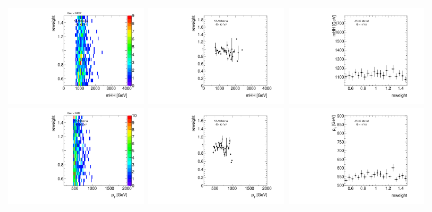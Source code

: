\begin{figure}[htbp!]
\begin{center}
\includegraphics[angle=270, width=0.32\textwidth]{./figures/boosted/AppendixReweight/Weights/4Trk_Signal_mHH_l_weight.pdf}
\includegraphics[angle=270, width=0.32\textwidth]{./figures/boosted/AppendixReweight/Weights/4Trk_Signal_mHH_l_weight_profx.pdf}
\includegraphics[angle=270, width=0.32\textwidth]{./figures/boosted/AppendixReweight/Weights/4Trk_Signal_mHH_l_weight_profy.pdf}\\
\includegraphics[angle=270, width=0.32\textwidth]{./figures/boosted/AppendixReweight/Weights/4Trk_Signal_leadHCand_Pt_m_weight.pdf}
\includegraphics[angle=270, width=0.32\textwidth]{./figures/boosted/AppendixReweight/Weights/4Trk_Signal_leadHCand_Pt_m_weight_profx.pdf}
\includegraphics[angle=270, width=0.32\textwidth]{./figures/boosted/AppendixReweight/Weights/4Trk_Signal_leadHCand_Pt_m_weight_profy.pdf}\\

\end{center}
\end{figure}
